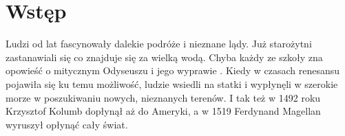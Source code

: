 \documentclass[a4paper]{book}
\begin{document}
	

\kslistofremarks

\cleardoublepage

	
\mainmatter %
	
	\chapter{Wstęp}
	\label{id:cha:wstep}
	
		 
			Ludzi od lat fascynowały dalekie podróże i nieznane lądy. Już starożytni zastanawiali się co znajduje się za wielką wodą. Chyba każdy ze szkoły zna opowieść o mitycznym Odyseuszu i jego wyprawie . Kiedy w czasach renesansu pojawiła się ku temu możliwość, ludzie wsiedli na statki i wypłynęli w szerokie morze w poszukiwaniu nowych, nieznanych terenów. I tak też w 1492 roku Krzysztof Kolumb dopłynął aż do Ameryki, a w 1519 Ferdynand Magellan wyruszył opłynąć cały świat. 
			
\end{document}
